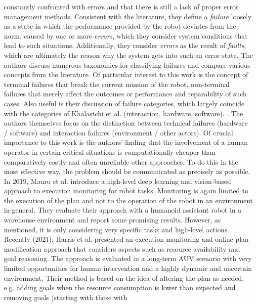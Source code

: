 \documentclass[english, master, utf8]{base/thesis_KBS}
\begin{document}
constantly confronted with errors and that there is still a lack of proper error management methods. Consistent with the literature, they define a \textit{failure} loosely as a
state in which the performance provided by the robot deviates from the norm, caused by one or more \textit{errors}, which they consider system conditions that lead to such
situations. Additionally, they consider \textit{errors} as the result of \textit{faults}, which are ultimately the reason why the system gets into such an error state.
The authors discuss numerous taxonomies for classifying failures and compare various concepts from the literature. Of particular
interest to this work is the concept of terminal failures that break the current mission of the robot, non-terminal failures that merely affect the outcomes or performance and
reparability of such cases. Also useful is their discussion of failure categories, which largely coincide with the categories of Khalastchi et al. (interaction, hardware, software).
\cite{Khalastchi:2018}. The authors themselves focus on the distinction between technical failures (hardware / software) and interaction failures (environment / other actors).
Of crucial importance to this work is the authors' finding that the involvement of a human operator in certain critical situations is computationally cheaper than comparatively
costly and often unreliable other approaches. To do this in the most effective way, the problem should be communicated as precisely as possible. \cite{Honig:2018}\newline
In 2019, Mauro et al. \cite{Mauro:2019} introduce a high-level deep learning and vision-based approach to execution monitoring for robot tasks. Monitoring is again limited to the execution of the
plan and not to the operation of the robot in an environment in general. They evaluate their approach with a humanoid assistant robot in a warehouse environment and report some
promising results. However, as mentioned, it is only considering very specific tasks and high-level actions.\newline
Recently (2021), Harris et al. \cite{Harris:2021} presented an execution monitoring and online plan modification approach that considers aspects such as resource availability
and goal reasoning. The approach is evaluated in a long-term AUV scenario with very limited opportunities for human intervention and a highly dynamic and uncertain environment.
Their method is based on the idea of altering the plan as needed, e.g. adding goals when the resource consumption is lower than expected and removing goals (starting with those with
\end{document}
